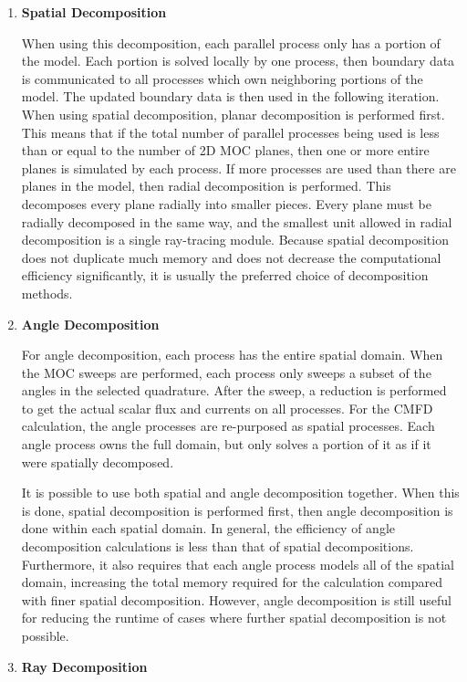 \begin{enumerate}[leftmargin=*]
\item \textbf{Spatial Decomposition}

When using this decomposition, each parallel process only has a portion of the model.  Each portion is solved locally by one process, then boundary data is communicated to all processes which own neighboring portions of the model.  The updated boundary data is then used in the following iteration.  When using spatial decomposition, planar decomposition is performed first.  This means that if the total number of parallel processes being used is less than or equal to the number of 2D MOC planes, then one or more entire planes is simulated by each process.  If more processes are used than there are planes in the model, then radial decomposition is performed.  This decomposes every plane radially into smaller pieces.  Every plane must be radially decomposed in the same way, and the smallest unit allowed in radial decomposition is a single ray-tracing module.  Because spatial decomposition does not duplicate much memory and does not decrease the computational efficiency significantly, it is usually the preferred choice of decomposition methods.

\item \textbf{Angle Decomposition}

For angle decomposition, each process has the entire spatial domain.  When the MOC sweeps are performed, each process only sweeps a subset of the angles in the selected quadrature.  After the sweep, a reduction is performed to get the actual scalar flux and currents on all processes.  For the CMFD calculation, the angle processes are re-purposed as spatial processes.  Each angle process owns the full domain, but only solves a portion of it as if it were spatially decomposed.

It is possible to use both spatial and angle decomposition together.  When this is done, spatial decomposition is performed first, then angle decomposition is done within each spatial domain.  In general, the efficiency of angle decomposition calculations is less than that of spatial decompositions.  Furthermore, it also requires that each angle process models all of the spatial domain, increasing the total memory required for the calculation compared with finer spatial decomposition.  However, angle decomposition is still useful for reducing the runtime of cases where further spatial decomposition is not possible.

\item \textbf{Ray Decomposition}


\end{enumerate}
